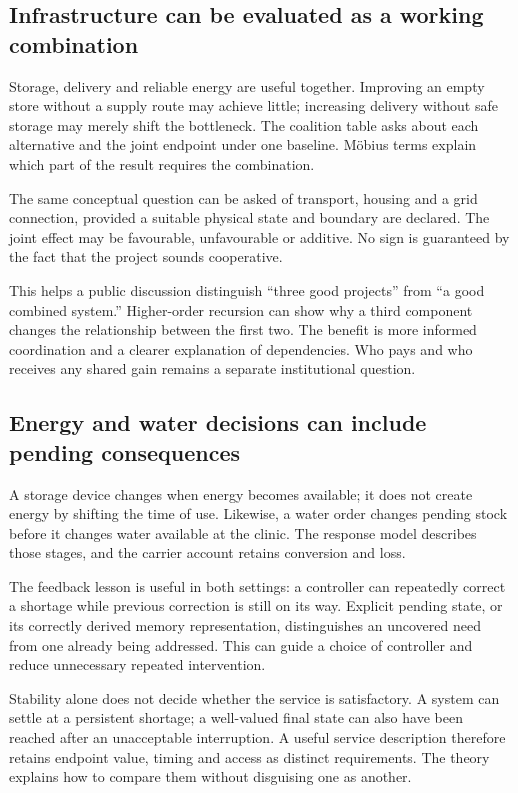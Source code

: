 \subsection{Infrastructure can be evaluated as a working combination}
Storage, delivery and reliable energy are useful together. Improving an empty store without a supply route may achieve little; increasing delivery without safe storage may merely shift the bottleneck. The coalition table asks about each alternative and the joint endpoint under one baseline. Möbius terms explain which part of the result requires the combination.

The same conceptual question can be asked of transport, housing and a grid connection, provided a suitable physical state and boundary are declared. The joint effect may be favourable, unfavourable or additive. No sign is guaranteed by the fact that the project sounds cooperative.

This helps a public discussion distinguish ``three good projects'' from ``a good combined system.'' Higher-order recursion can show why a third component changes the relationship between the first two. The benefit is more informed coordination and a clearer explanation of dependencies. Who pays and who receives any shared gain remains a separate institutional question.

\subsection{Energy and water decisions can include pending consequences}
A storage device changes when energy becomes available; it does not create energy by shifting the time of use. Likewise, a water order changes pending stock before it changes water available at the clinic. The response model describes those stages, and the carrier account retains conversion and loss.

The feedback lesson is useful in both settings: a controller can repeatedly correct a shortage while previous correction is still on its way. Explicit pending state, or its correctly derived memory representation, distinguishes an uncovered need from one already being addressed. This can guide a choice of controller and reduce unnecessary repeated intervention.

Stability alone does not decide whether the service is satisfactory. A system can settle at a persistent shortage; a well-valued final state can also have been reached after an unacceptable interruption. A useful service description therefore retains endpoint value, timing and access as distinct requirements. The theory explains how to compare them without disguising one as another.


